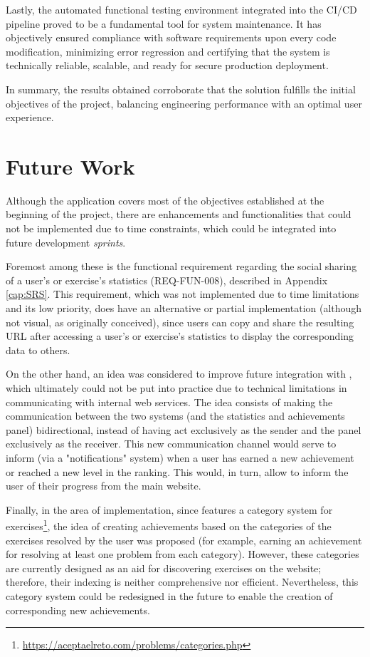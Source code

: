 Lastly, the automated functional testing environment integrated into the CI/CD pipeline proved to be a fundamental tool for system maintenance. It has objectively ensured compliance with software requirements upon every code modification, minimizing error regression and certifying that the system is technically reliable, scalable, and ready for secure production deployment.

In summary, the results obtained corroborate that the solution fulfills the initial objectives of the project, balancing engineering performance with an optimal user experience.

\section{Future Work}

Although the application covers most of the objectives established at the beginning of the project, there are enhancements and functionalities that could not be implemented due to time constraints, which could be integrated into future development \textit{sprints}.

Foremost among these is the functional requirement regarding the social sharing of a user's or exercise's statistics (REQ-FUN-008), described in Appendix \ref{cap:SRS}. This requirement, which was not implemented due to time limitations and its low priority, does have an alternative or partial implementation (although not visual, as originally conceived), since users can copy and share the resulting URL after accessing a user's or exercise's statistics to display the corresponding data to others.

On the other hand, an idea was considered to improve future integration with \aer, which ultimately could not be put into practice due to technical limitations in communicating with internal \aer web services. The idea consists of making the communication between the two systems (\aer and the statistics and achievements panel) bidirectional, instead of having \aer act exclusively as the sender and the panel exclusively as the receiver. This new communication channel would serve to inform \aer (via a "notifications" system) when a user has earned a new achievement or reached a new level in the ranking. This would, in turn, allow \aer to inform the user of their progress from the main website.

Finally, in the area of implementation, since \aer features a category system for exercises\footnote{\url{https://aceptaelreto.com/problems/categories.php}}, the idea of creating achievements based on the categories of the exercises resolved by the user was proposed (for example, earning an achievement for resolving at least one problem from each category). However, these categories are currently designed as an aid for discovering exercises on the website; therefore, their indexing is neither comprehensive nor efficient. Nevertheless, this category system could be redesigned in the future to enable the creation of corresponding new achievements.

